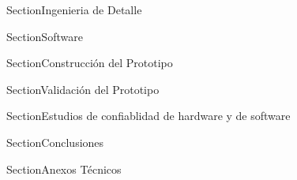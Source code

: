 




\setmainfont{Avenir LT Std 55 Roman}




\setmainfont{Calibri}




\newpage


\MyIndex

\hypersetup{linkcolor=AzulInfo}

\newpage
















Section{Ingenieria de Detalle}


Section{Software}


Section{Construcción del Prototipo}


Section{Validación del Prototipo}


Section{Estudios de confiablidad de hardware y de software}


Section{Conclusiones}


\newpage


Section{Anexos Técnicos}



